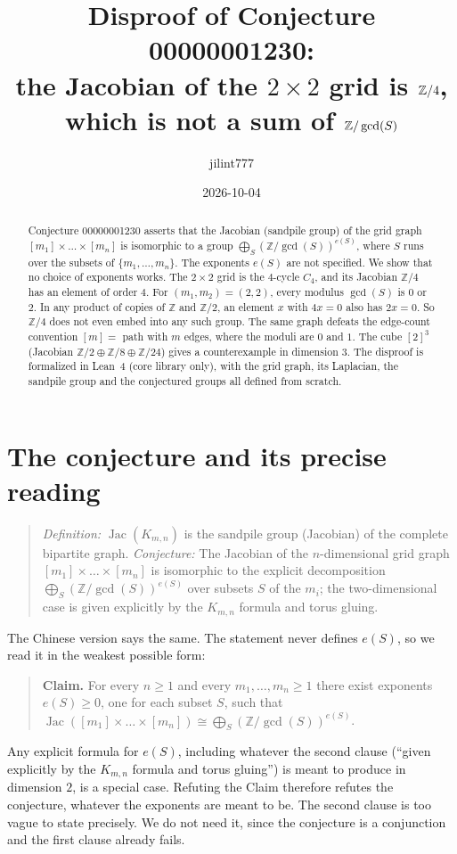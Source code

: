 \documentclass[11pt]{article}
\title{Disproof of Conjecture 00000001230:\\
the Jacobian of the $2\times2$ grid is $\Z/4$, which is not a sum of $\Z/\gcd(S)$}
\author{jilint777}
\date{2026-10-04}
\theoremstyle{definition}
\theoremstyle{remark}
\newcommand{\Z}{\mathbb{Z}}
\newcommand{\Jac}{\operatorname{Jac}}
\begin{document}
\sloppy
\maketitle

\begin{abstract}
Conjecture 00000001230 asserts that the Jacobian (sandpile group) of the grid
graph $[m_1]\times\dots\times[m_n]$ is isomorphic to a group
$\bigoplus_S(\Z/\gcd(S))^{e(S)}$, where $S$ runs over the subsets of
$\{m_1,\dots,m_n\}$. The exponents $e(S)$ are not specified. We show that no
choice of exponents works. The $2\times2$ grid is the $4$-cycle $C_4$, and its
Jacobian $\Z/4$ has an element of order $4$. For $(m_1,m_2)=(2,2)$, every
modulus $\gcd(S)$ is $0$ or $2$. In any product of copies of $\Z$ and $\Z/2$,
an element $x$ with $4x=0$ also has $2x=0$. So $\Z/4$ does not even embed into
any such group. The same graph defeats the edge-count convention
$[m]=$ path with $m$ edges, where the moduli are $0$ and $1$. The cube
$[2]^3$ (Jacobian $\Z/2\oplus\Z/8\oplus\Z/24$) gives a counterexample in
dimension $3$. The disproof is formalized in Lean~4 (core library only), with
the grid graph, its Laplacian, the sandpile group and the conjectured groups
all defined from scratch.
\end{abstract}

\section{The conjecture and its precise reading}
\begin{quote}
\emph{Definition:} $\Jac(K_{m,n})$ is the sandpile group (Jacobian) of the
complete bipartite graph. \emph{Conjecture:} The Jacobian of the
$n$-dimensional grid graph $[m_1]\times\dots\times[m_n]$ is isomorphic to the
explicit decomposition $\bigoplus_S(\Z/\gcd(S))^{e(S)}$ over subsets $S$ of
the $m_i$; the two-dimensional case is given explicitly by the $K_{m,n}$
formula and torus gluing.
\end{quote}
The Chinese version says the same. The statement never defines $e(S)$, so we
read it in the weakest possible form:
\begin{quote}
\textbf{Claim.} For every $n\ge1$ and every $m_1,\dots,m_n\ge1$ there exist
exponents $e(S)\ge0$, one for each subset $S$, such that
$\Jac([m_1]\times\dots\times[m_n])\cong\bigoplus_S(\Z/\gcd(S))^{e(S)}$.
\end{quote}
Any explicit formula for $e(S)$, including whatever the second clause
(``given explicitly by the $K_{m,n}$ formula and torus gluing'') is meant to
produce in dimension $2$, is a special case. Refuting the Claim therefore
refutes the conjecture, whatever the exponents are meant to be.
The second clause is too vague to state precisely. We do not need it, since
the conjecture is a conjunction and the first clause already fails.
\end{document}
